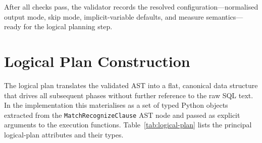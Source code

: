\noindent
After all checks pass, the validator records the resolved
configuration—normalised output mode, skip mode, implicit-variable
defaults, and measure semantics—ready for the logical planning step.

\section{Logical Plan Construction}
\label{sec:meth-logical}

The logical plan translates the validated AST into a flat,
canonical data structure that drives all subsequent phases without
further reference to the raw SQL text.  In the implementation this
materialises as a set of typed Python objects extracted from the
\texttt{MatchRecognizeClause} AST node and passed as explicit
arguments to the execution functions.
Table~\ref{tab:logical-plan} lists the principal logical-plan
attributes and their types.

